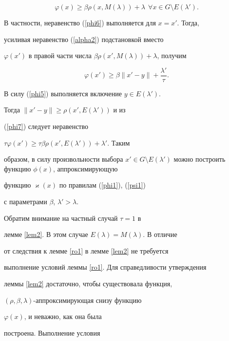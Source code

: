 \begin{pf}
\begin{equation}
\varphi(x)\geq\beta\rho(x,M(\lambda))+\lambda


\ \ \forall x\in G\setminus E(\lambda').


\end{equation}


В частности, неравенство (\ref{phi6}) выполняется для $x=x'$. Тогда, 


усиливая неравенство (\ref{alpha2}) подстановкой вместо


$\varphi(x')$ в правой части числа $\beta\rho(x',M(\lambda))+\lambda$, получим


\begin{equation}\label{phi7}


\varphi(x')\geq\beta\|x'-y\|+\frac{\lambda'}{\tau}.


\end{equation}


В силу (\ref{phi5}) выполняется включение $y\in E(\lambda')$.


Тогда $\|x'-y\|\geq\rho(x',E(\lambda'))$ и из


(\ref{phi7}) следует неравенство


$\tau\varphi(x')\geq\tau\beta\rho(x',E(\lambda'))+\lambda'$. Таким


образом, в силу произвольности выбора $x'\in G\setminus


E(\lambda')$ можно построить функцию $\phi(x)$, аппроксимирующую


функцию $\varkappa(x)$ по правилам (\ref{phi1}), (\ref{psi1})


с параметрами $\beta$, $\lambda'>\lambda$.


\end{pf}





Обратим внимание на частный случай $\tau=1$ в


лемме \ref{lem2}. В этом случае $E(\lambda)=M(\lambda)$. В отличие


от следствия к лемме \ref{ro1} в лемме \ref{lem2} не требуется


выполнение условий леммы \ref{ro1}. Для справедливости утверждения


леммы \ref{lem2} достаточно, чтобы существовала функция,


$(\rho,\beta,\lambda)$-аппроксимирующая снизу функцию


$\varphi(x)$, и неважно, как она была


построена. Выполнение условия


